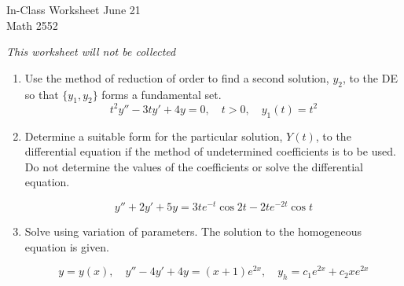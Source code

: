 \documentclass[12pt]{article}
\newcommand{\TestName}{In-Class Worksheet June 21}
\begin{document}
    
\vspace*{-.5cm}


\newcommand{\Course}{Math 2552}

\begin{center}
{\Large \TestName 
\\[4pt]
\Course}
\end{center}

\begin{center}    
{\small
\textit{This worksheet will not be collected}
}
\end{center}


\begin{enumerate}[label=\Alph*)]
    
    \item Use the method of reduction of order to find a second solution, $y_2$, to the DE so that $\{y_1,y_2\}$ forms a fundamental set. $$  t^2 y'' - 3t y' + 4y = 0, \quad t>0, \quad y_1(t) = t^2$$

    \item Determine a suitable form for the particular solution, $Y(t)$, to the differential equation if the method of undetermined coefficients is to be used. Do not determine the values of the coefficients or solve the differential equation. 

    $$y'' + 2y' + 5y = 3te^{-t} \cos2t -2 te^{-2t} \cos t$$ 
    
    \item Solve using variation of parameters. The solution to the homogeneous equation is given. 
    
    $$y=y(x), \quad y'' - 4y' + 4y =(x+1)e^{2x}, \quad y_h = c_1 e^{2x} + c_2 xe^{2x}$$
    
\end{enumerate}
\end{document}
